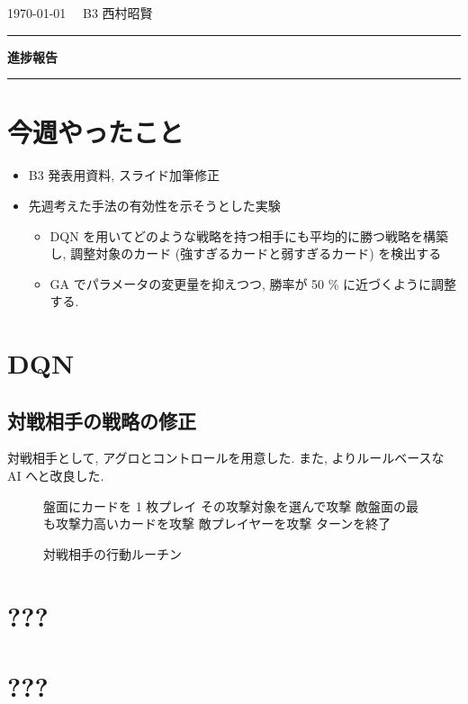 \documentclass{jarticle}     %
\begin{document}
  \noindent
  \onecolumn
  \hspace{1em}

  \today
  \hfill
  \ \  B3 西村昭賢 

  \vspace{2mm}
  \hrule
  \begin{center}
  {\Large \bf 進捗報告}
  \end{center}
  \hrule
  \vspace{3mm}


\section{今週やったこと}
\begin{itemize}
  \item B3 発表用資料, スライド加筆修正
  \item 先週考えた手法の有効性を示そうとした実験
  \par
  \begin{itemize}
    \item DQN を用いてどのような戦略を持つ相手にも平均的に勝つ戦略を構築し, 調整対象のカード (強すぎるカードと弱すぎるカード) を検出する
    \item GA でパラメータの変更量を抑えつつ, 勝率が 50 \% に近づくように調整する.
  \end{itemize}
\end{itemize}


\section{DQN}
\subsection{対戦相手の戦略の修正}
対戦相手として, アグロとコントロールを用意した. また, よりルールベースな AI へと改良した. 

\begin{figure}[t]
  \vspace{-0.3cm}
  \begin{algorithm}[H]
    \small
      \caption{
        対戦相手の行動ルーチン
        }
      \label{alg1}
      \begin{algorithmic}[1] 
      \STATE 盤面にカードを 1 枚プレイ
      \STATE その攻撃対象を選んで攻撃
      \ELSE
      \STATE 敵盤面の最も攻撃力高いカードを攻撃
      \ELSE
      \STATE 敵プレイヤーを攻撃
      \ENDIF
      \ENDIF
      \ENDFOR
      \STATE ターンを終了
      \end{algorithmic}
  \end{algorithm}
  \vspace{-0.3cm}
  \end{figure}



\section{???}


\section{???}




\end{document}
